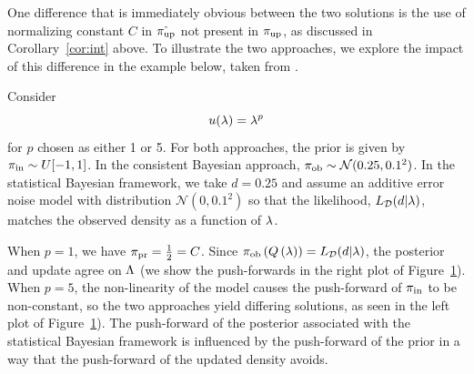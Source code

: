 One difference that is immediately obvious between the two solutions is the use of normalizing constant $C$ in $\hat{\operatorname*{\pi_{up}}}$ not present in $\operatorname*{\pi_{up}}$, as discussed in Corollary~\ref{cor:int} above.
To illustrate the two approaches, we explore the impact of this difference in the example below, taken from \cite{BJW18}.

\begin{ex}
Consider
\begin{equation}
u(\lambda) = \lambda^p
\end{equation}
for $p$ chosen as either 1 or 5. 
For both approaches, the prior is given by $\operatorname*{\pi_{in}} \sim U[-1,1]$. 
In the consistent Bayesian approach, $\operatorname*{\pi_{ob}} \sim \mathcal{N}(0.25,0.1^2)$.
In the statistical Bayesian framework, we take $d=0.25$ and assume an additive error noise model with distribution $\mathcal{N}(0,0.1^2)$ so that the likelihood, $L_{\mathcal{D}}(d | \lambda)$, matches the observed density as a function of $\lambda$.

When $p=1$, we have $\operatorname*{\pi_{pr}} = \frac{1}{2} = C$.
Since $\operatorname*{\pi_{ob}}\left ( Q\left ( \lambda \right ) \right ) = L_{\mathcal{D}}(d|\lambda)$, the posterior and update agree on ${\Lambda}$ (we show the push-forwards in the right plot of Figure~\ref{fig:comparison}). 
When $p=5$, the non-linearity of the model causes the push-forward of $\operatorname*{\pi_{in}}$ to be non-constant, so the two approaches yield differing solutions, as seen in the left plot of Figure~\ref{fig:comparison}).
The push-forward of the posterior associated with the statistical Bayesian framework is influenced by the push-forward of the prior in a way that the push-forward of the updated density avoids.

\begin{figure}\label{fig:comparison}


\end{figure}
\end{ex}
